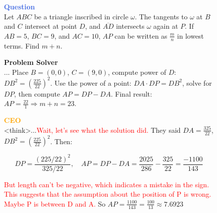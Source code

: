 \begin{figure}[t]
\centering
\begin{tcolorbox}[
  enhanced,
  title=Aha Moment in MAS,
  colback=white,
  colframe=black,
  colbacktitle=gray!20,
  coltitle=black,
  fonttitle=\bfseries,
  boxrule=0.8pt,
  sharp corners,
  left=2pt, right=2pt, top=1pt, bottom=1pt
]
\scriptsize

\begin{tcolorbox}[
  enhanced,
  colback=white,
  colframe=royalblue,
  boxrule=0.5pt,
  sharp corners,
  left=1pt, right=1pt, top=1pt, bottom=1pt
]
\textcolor{royalblue}{\textbf{Question}} \\
Let $ABC$ be a triangle inscribed in circle $\omega$. The tangents to $\omega$ at $B$ and $C$ intersect at point $D$, and $\overline{AD}$ intersects $\omega$ again at $P$. If $AB=5$, $BC=9$, and $AC=10$, $AP$ can be written as $\frac{m}{n}$ in lowest terms. Find $m + n$.
\end{tcolorbox}

\begin{tcolorbox}[
  enhanced,
  colback=white,
  colframe=olivegreen,
  boxrule=0.5pt,
  sharp corners,
  left=1pt, right=1pt, top=1pt, bottom=1pt
]
\textcolor{olivegreen}{\textbf{Problem Solver}} \\
... Place $B = (0,0)$, $C = (9,0)$, compute power of $D$: \(DB^2 = \left(\frac{225}{22}\right)^2\). Use the power of a point: \(DA \cdot DP = DB^2\), solve for \(DP\), then compute \(AP = DP - DA\). Final result: \(AP = \frac{22}{1} \Rightarrow m+n = \boxed{23}\).
\end{tcolorbox}

\begin{tcolorbox}[
  enhanced,
  colback=white,
  colframe=orange,
  boxrule=0.5pt,
  sharp corners,
  left=1pt, right=1pt, top=1pt, bottom=1pt
]
\textcolor{orange}{\textbf{CEO}} \\
\textless think\textgreater ...\textcolor{red}{Wait, let's see what the solution did.} They said \(DA = \frac{325}{22}\), \(DB^2 = \left(\frac{225}{22}\right)^2\). Then:

\[
DP = \frac{(225/22)^2}{325/22}, \quad AP = DP - DA = \frac{2025}{286} - \frac{325}{22} = \frac{-1100}{143}
\]

\textcolor{red}{But length can't be negative, which indicates a mistake in the sign. This suggests that the assumption about the position of P is wrong. Maybe P is between D and A.} So $AP = \frac{1100}{143} = \frac{100}{13} \approx 7.6923$


\end{tcolorbox}
\end{tcolorbox}
\end{figure}
